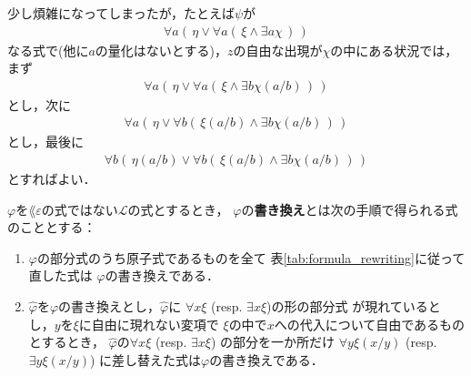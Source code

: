 	少し煩雑になってしまったが，たとえば$\psi$が
	\begin{align}
		\forall a (\, \eta \vee \forall a (\, \xi \wedge \exists a \chi\, )\, )
	\end{align}
	なる式で(他に$a$の量化はないとする)，$z$の自由な出現が$\chi$の中にある状況では，まず
	\begin{align}
		\forall a (\, \eta \vee \forall a (\, \xi \wedge \exists b \chi(a/b)\, )\, )
	\end{align}
	とし，次に
	\begin{align}
		\forall a (\, \eta \vee \forall b (\, \xi(a/b) \wedge \exists b \chi(a/b)\, )\, )
	\end{align}
	とし，最後に
	\begin{align}
		\forall b (\, \eta(a/b) \vee \forall b (\, \xi(a/b) \wedge \exists b \chi(a/b)\, )\, )
	\end{align}
	とすればよい．
	
	\begin{screen}
		\begin{metadfn}[式の書き換え]\label{def:formula_rewriting}
			$\varphi$を$\lang{\varepsilon}$の式ではない$\mathcal{L}$の式とするとき，
			$\varphi$の{\bf 書き換え}とは次の手順で得られる式のこととする：
			\begin{enumerate}
				\item $\varphi$の部分式のうち原子式であるものを全て
					表\ref{tab:formula_rewriting}に従って直した式は
					$\varphi$の書き換えである．
					
				\item $\widehat{\varphi}$を$\varphi$の書き換えとし，$\widehat{\varphi}$に
					$\forall x \xi$ (resp. $\exists x \xi$)の形の部分式\footnotemark
					が現れているとし，$y$を$\xi$に自由に現れない変項で
					$\xi$の中で$x$への代入について自由であるものとするとき，
					$\widehat{\varphi}$の$\forall x \xi$ (resp. $\exists x \xi$)
					の部分を一か所だけ\footnotemark
					$\forall y \xi(x/y)$ (resp. $\exists y \xi(x/y)$)
					に差し替えた式は$\varphi$の書き換えである．
			\end{enumerate}
		\end{metadfn}
	\end{screen}
	
	
	
